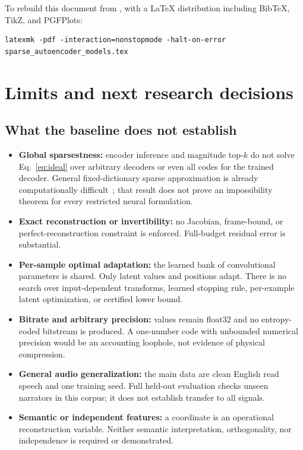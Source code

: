 \documentclass[11pt,a4paper]{article}
\newcommand{\code}[1]{\texttt{\small\detokenize{#1}}}
\begin{document}
To rebuild this document from \code{documentation/}, with a \LaTeX{} distribution including BibTeX, TikZ, and PGFPlots:
\begin{lstlisting}
latexmk -pdf -interaction=nonstopmode -halt-on-error sparse_autoencoder_models.tex
\end{lstlisting}

\section{Limits and next research decisions}
\subsection{What the baseline does not establish}
\begin{itemize}
\item \textbf{Global sparsestness:} encoder inference and magnitude top-$k$ do not solve Eq.~\eqref{eq:ideal} over arbitrary decoders or even all codes for the trained decoder. General fixed-dictionary sparse approximation is already computationally difficult~\cite{natarajan1995}; that result does not prove an impossibility theorem for every restricted neural formulation.
\item \textbf{Exact reconstruction or invertibility:} no Jacobian, frame-bound, or perfect-reconstruction constraint is enforced. Full-budget residual error is substantial.
\item \textbf{Per-sample optimal adaptation:} the learned bank of convolutional parameters is shared. Only latent values and positions adapt. There is no search over input-dependent transforms, learned stopping rule, per-example latent optimization, or certified lower bound.
\item \textbf{Bitrate and arbitrary precision:} values remain float32 and no entropy-coded bitstream is produced. A one-number code with unbounded numerical precision would be an accounting loophole, not evidence of physical compression.
\item \textbf{General audio generalization:} the main data are clean English read speech and one training seed. Full held-out \code{test-clean} evaluation checks unseen narrators in this corpus; it does not establish transfer to all signals.
\item \textbf{Semantic or independent features:} a coordinate is an operational reconstruction variable. Neither semantic interpretation, orthogonality, nor independence is required or demonstrated.
\end{itemize}
\end{document}
